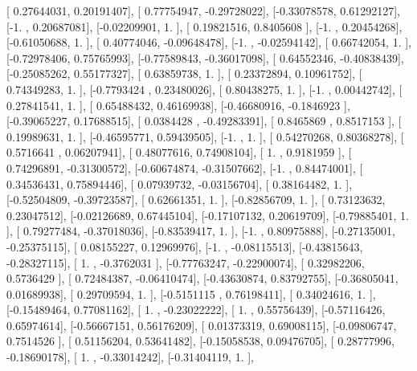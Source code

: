 \documentclass{article}
\begin{document}
       [ 0.27644031,  0.20191407],
       [ 0.77754947, -0.29728022],
       [-0.33078578,  0.61292127],
       [-1.        ,  0.20687081],
       [-0.02209901,  1.        ],
       [ 0.19821516,  0.8405608 ],
       [-1.        ,  0.20454268],
       [-0.61050688,  1.        ],
       [ 0.40774046, -0.09648478],
       [-1.        , -0.02594142],
       [ 0.66742054,  1.        ],
       [-0.72978406,  0.75765993],
       [-0.77589843, -0.36017098],
       [ 0.64552346, -0.40838439],
       [-0.25085262,  0.55177327],
       [ 0.63859738,  1.        ],
       [ 0.23372894,  0.10961752],
       [ 0.74349283,  1.        ],
       [-0.7793424 ,  0.23480026],
       [ 0.80438275,  1.        ],
       [-1.        ,  0.00442742],
       [ 0.27841541,  1.        ],
       [ 0.65488432,  0.46169938],
       [-0.46680916, -0.1846923 ],
       [-0.39065227,  0.17688515],
       [ 0.0384428 , -0.49283391],
       [ 0.8465869 ,  0.8517153 ],
       [ 0.19989631,  1.        ],
       [-0.46595771,  0.59439505],
       [-1.        ,  1.        ],
       [ 0.54270268,  0.80368278],
       [ 0.5716641 ,  0.06207941],
       [ 0.48077616,  0.74908104],
       [ 1.        ,  0.9181959 ],
       [ 0.74296891, -0.31300572],
       [-0.60674874, -0.31507662],
       [-1.        ,  0.84474001],
       [ 0.34536431,  0.75894446],
       [ 0.07939732, -0.03156704],
       [ 0.38164482,  1.        ],
       [-0.52504809, -0.39723587],
       [ 0.62661351,  1.        ],
       [-0.82856709,  1.        ],
       [ 0.73123632,  0.23047512],
       [-0.02126689,  0.67445104],
       [-0.17107132,  0.20619709],
       [-0.79885401,  1.        ],
       [ 0.79277484, -0.37018036],
       [-0.83539417,  1.        ],
       [-1.        ,  0.80975888],
       [-0.27135001, -0.25375115],
       [ 0.08155227,  0.12969976],
       [-1.        , -0.08115513],
       [-0.43815643, -0.28327115],
       [ 1.        , -0.3762031 ],
       [-0.77763247, -0.22900074],
       [ 0.32982206,  0.5736429 ],
       [ 0.72484387, -0.06410474],
       [-0.43630874,  0.83792755],
       [-0.36805041,  0.01689938],
       [ 0.29709594,  1.        ],
       [-0.5151115 ,  0.76198411],
       [ 0.34024616,  1.        ],
       [-0.15489464,  0.77081162],
       [ 1.        , -0.23022222],
       [ 1.        ,  0.55756439],
       [-0.57116426,  0.65974614],
       [-0.56667151,  0.56176209],
       [ 0.01373319,  0.69008115],
       [-0.09806747,  0.7514526 ],
       [ 0.51156204,  0.53641482],
       [-0.15058538,  0.09476705],
       [ 0.28777996, -0.18690178],
       [ 1.        , -0.33014242],
       [-0.31404119,  1.        ],
\end{document}
